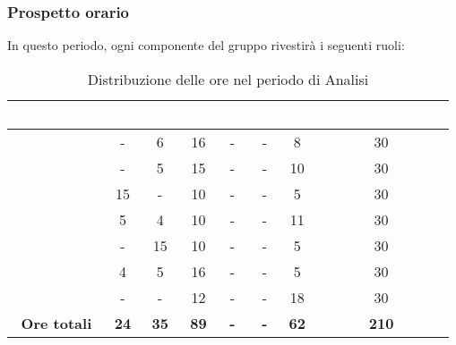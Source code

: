 \subsubsection{Prospetto orario}
In questo periodo, ogni componente del gruppo rivestirà i seguenti ruoli:
\begin{table}[H]
	\begin{center}
		\begin{tabular}{ |c c c c c c c c|}
		\rowcolor{darkblue} 
		\textcolor{white}{\textbf{Nominativo}} & \textcolor{white}{\textbf{Re}} & \textcolor{white}{\textbf{Am}} & \textcolor{white}{\textbf{An}} & \textcolor{white}{\textbf{Pt}} & \textcolor{white}{\textbf{Pr}} & \textcolor{white}{\textbf{Ve}} & \textcolor{white}{\textbf{Ore Complessive}} \\ \hline
		\BL 	& - 	& 6 	& 16 	& - 	& - 	& 8 	& 30 \\ \hline
		\FF 	& - 	& 5 	& 15 	& - 	& - 	& 10 	& 30 \\ \hline
		\MM	& 15	& - 	& 10 	& - 	& - 	& 5 	& 30 \\ \hline
		\PC	& 5 	& 4 	& 10 	& - 	& - 	& 11	& 30 \\ \hline
		\TG 	& - 	& 15	& 10 	& - 	& - 	& 5 	& 30 \\ \hline
		\TL 	& 4 	& 5 	& 16 	& - 	& - 	& 5 	& 30 \\ \hline
		\VD 	& - 	& -  	& 12 	& - 	& - 	& 18 	& 30 \\ \hline
		\textbf{Ore totali} & \textbf{24} & \textbf{35} & \textbf{89} & \textbf{-} & \textbf{-} & \textbf{62} & \textbf{210} \\ \hline
		\end{tabular}
	\caption{Distribuzione delle ore nel periodo di Analisi}
	\end{center}
\end{table}
